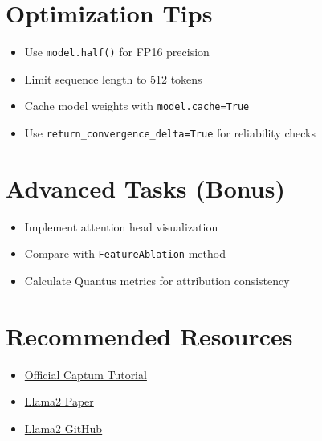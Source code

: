 \section*{Optimization Tips}
\begin{itemize}
\item Use \texttt{model.half()} for FP16 precision
\item Limit sequence length to 512 tokens
\item Cache model weights with \texttt{model.cache=True}
\item Use \texttt{return\_convergence\_delta=True} for reliability checks
\end{itemize}

\section*{Advanced Tasks (Bonus)}
\begin{itemize}
\item Implement attention head visualization
\item Compare with \texttt{FeatureAblation} method
\item Calculate Quantus metrics for attribution consistency
\end{itemize}

\section*{Recommended Resources}
\begin{itemize}
\item \href{https://captum.ai/tutorials/Llama2_LLM_Attribution}{Official Captum Tutorial}
\item \href{https://arxiv.org/abs/2307.03381}{Llama2 Paper}
\item \href{https://github.com/facebookresearch/llama}{Llama2 GitHub}
\end{itemize}
